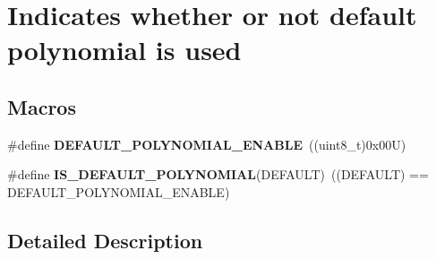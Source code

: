 \hypertarget{group___c_r_c___default___polynomial}{}\section{Indicates whether or not default polynomial is used}
\label{group___c_r_c___default___polynomial}
\subsection*{Macros}
\begin{DoxyCompactItemize}
\item 
\mbox{\label{group___c_r_c___default___polynomial_gab0832d9b81abb377d57b24ef582eaef1}} 
\#define {\bfseries D\+E\+F\+A\+U\+L\+T\+\_\+\+P\+O\+L\+Y\+N\+O\+M\+I\+A\+L\+\_\+\+E\+N\+A\+B\+LE}~((uint8\+\_\+t)0x00\+U)
\item 
\mbox{\label{group___c_r_c___default___polynomial_ga32d8416e8f3ca5b4f9ea4f123c709bb3}} 
\#define {\bfseries I\+S\+\_\+\+D\+E\+F\+A\+U\+L\+T\+\_\+\+P\+O\+L\+Y\+N\+O\+M\+I\+AL}(D\+E\+F\+A\+U\+LT)~((D\+E\+F\+A\+U\+LT) == D\+E\+F\+A\+U\+L\+T\+\_\+\+P\+O\+L\+Y\+N\+O\+M\+I\+A\+L\+\_\+\+E\+N\+A\+B\+LE)
\end{DoxyCompactItemize}


\subsection{Detailed Description}
